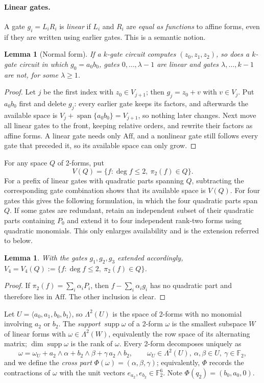 \documentclass[11pt,a4paper]{article}
\theoremstyle{plain}
\newtheorem{lemma}[theorem]{Lemma}
\theoremstyle{remark}
\newcommand{\F}{\mathbb F_2}
\newcommand{\Aff}{\mathrm{Aff}}
\newcommand{\Span}{\operatorname{span}}
\newcommand{\supp}{\operatorname{supp}}
\newcommand{\Lam}{\Lambda^2}
\begin{document}
\paragraph{Linear gates.}
A gate $g_i=L_iR_i$ is \emph{linear} if $L_i$ and $R_i$ are \emph{equal as functions} to affine forms, even if they are written using earlier gates. This is a semantic notion.

\begin{lemma}[Normal form]\label{l4:lem:normal}
If a $k$-gate circuit computes $(z_0,z_1,z_2)$, so does a $k$-gate circuit in which $g_0=a_0b_0$, gates $0,\dots,\lambda-1$ are linear and gates $\lambda,\dots,k-1$ are not, for some $\lambda\ge1$.
\end{lemma}

\begin{proof}
Let $j$ be the first index with $z_0\in V_{j+1}$; then $g_j=z_0+v$ with $v\in V_j$. Put $a_0b_0$ first and delete $g_j$: every earlier gate keeps its factors, and afterwards the available space is $V_j+\Span\{a_0b_0\}=V_{j+1}$, so nothing later changes. Next move all linear gates to the front, keeping relative orders, and rewrite their factors as affine forms. A linear gate needs only $\Aff$, and a nonlinear gate still follows every gate that preceded it, so its available space can only grow.
\end{proof}

For any space $Q$ of 2-forms, put
\[
 V(Q)=\{f:\deg f\le2,\ \pi_2(f)\in Q\}.
\]
For a prefix of linear gates with quadratic parts spanning $Q$, subtracting the corresponding gate combination shows that its available space is $V(Q)$. For four gates this gives the following formulation, in which the four quadratic parts span $Q$. If some gates are redundant, retain an independent subset of their quadratic parts containing $P_0$ and extend it to four independent rank-two forms using quadratic monomials. This only enlarges availability and is the extension referred to below.
\begin{lemma}\label{l4:lem:Qonly}
With the gates $g_1,g_2,g_3$ extended accordingly, $V_4=V_4(Q):=\{f:\deg f\le 2,\ \pi_2(f)\in Q\}$.
\end{lemma}

\begin{proof}
If $\pi_2(f)=\sum_i\alpha_iP_i$, then $f-\sum_i\alpha_ig_i$ has no quadratic part and therefore lies in $\Aff$. The other inclusion is clear.
\end{proof}


Let $U=\langle a_0,a_1,b_0,b_1\rangle$, so $\Lam(U)$ is the space of 2-forms with no monomial involving $a_2$ or $b_2$. The \emph{support} $\supp\omega$ of a 2-form $\omega$ is the smallest subspace $W$ of linear forms with $\omega\in\Lam(W)$, equivalently the row space of its alternating matrix; $\dim\supp\omega$ is the rank of $\omega$. Every 2-form decomposes uniquely as
\[
  \omega=\omega_U+a_2\wedge\alpha+b_2\wedge\beta+\gamma\,a_2\wedge b_2,\qquad \omega_U\in\Lam(U),\ \alpha,\beta\in U,\ \gamma\in\F,
\]
and we define the \emph{cross part} $\Phi(\omega)=(\alpha,\beta,\gamma)$; equivalently, $\Phi$ records the contractions of $\omega$ with the unit vectors $e_{a_2},e_{b_2}\in\F^6$. Note $\Phi(q_2)=(b_0,a_0,0)$.
\end{document}
